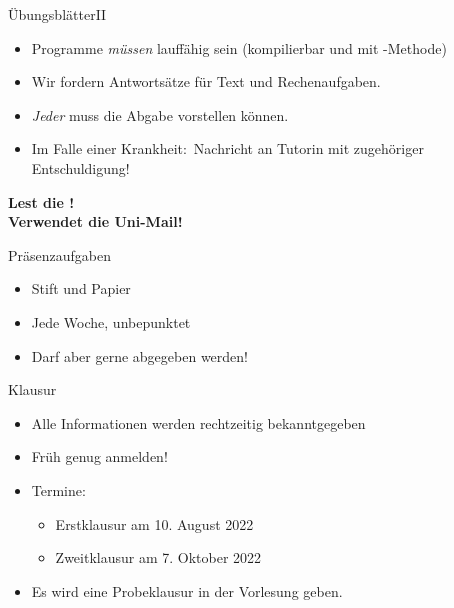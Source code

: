 \begin{frame}[t]{Übungsblätter\hfill II}
    \begin{itemize}[<+(1)->]
        \itemsep10.5pt
        \item Programme \emph{müssen} lauffähig sein (kompilierbar und mit -Methode)\pause
        \item Wir fordern Antwortsätze für Text und Rechenaufgaben.
        \item \emph{Jeder} muss die Abgabe vorstellen können.\pause{}
        \item Im Falle einer Krankheit:\pause~Nachricht an Tutor\gend in mit zugehöriger Entschuldigung!
    \end{itemize}
    \vfill
    \begin{center}
        \pause\bfseries Lest die !\\
        \pause\bfseries Verwendet die Uni-Mail!
    \end{center}
\end{frame}

\iffull
\begin{frame}[t]{Präsenzaufgaben}
    \begin{itemize}[<+(1)->]
        \itemsep10pt
        \item Stift und Papier
        \item Jede Woche, unbepunktet
        \item Darf aber gerne abgegeben werden!
    \end{itemize}
\end{frame}
\fi

\begin{frame}{Klausur}
    \begin{itemize}
        \itemsep16pt
        \item Alle Informationen werden rechtzeitig bekanntgegeben
        \item Früh genug anmelden!
        \item Termine: \begin{itemize}
            \item Erstklausur am 10. August 2022
            \item Zweitklausur am 7. Oktober 2022
        \end{itemize}
        \item Es wird eine Probeklausur in der Vorlesung geben.\pause{}
    \end{itemize}
\end{frame}

